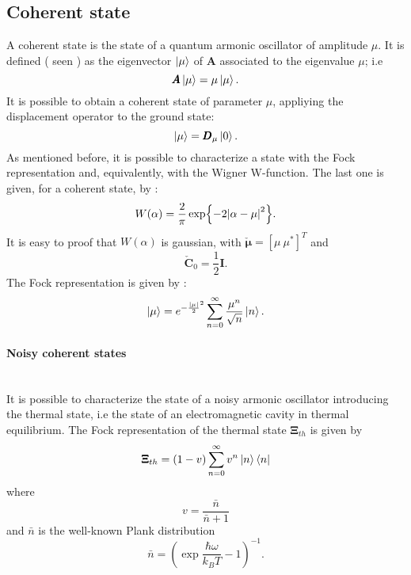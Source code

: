     \subsection{Coherent state}
        A coherent state is the state of a quantum armonic oscillator of amplitude $\mu$.
        It is defined (\cite{tesiGuerrini} seen \cite{CohSt_Glauber,CohSt_Glauber2}) as the eigenvector $\ket{\mu}$ of $\pmb{A}$ 
        associated to the eigenvalue $\mu$; i.e
        \begin{equation}
            \pmb{A}\ket{\mu}=\mu\ket{\mu}.
        \end{equation}
        It is possible to obtain a coherent state of parameter $\mu$, appliying the displacement
        operator to the ground state:
        \begin{equation}
            \ket{\mu}=\pmb{D}_\mu\ket{0}.
        \end{equation}
        As mentioned before, it is possible to characterize a state with the Fock representation
        and, equivalently, with the Wigner W-function. The last one is given, for a coherent state,
        by \cite{QuantumNoise}:
        \begin{equation}
            W(\alpha)=\frac{2}{\pi}\exp{-2\absolutevalue{\alpha-\mu}^2}.
            \label{eq:WignerCoh}
        \end{equation}
        It is easy to proof that $W(\alpha)$ is gaussian, with $\check{\pmb{\mu}}=[\mu\ \mu^*]^T$ and
        \begin{equation*}
            \check{\pmb{C}}_0=\frac{1}{2}\pmb{I}.
        \end{equation*} 
        The Fock representation is given by \cite{Dowling}:
        \begin{equation}
            \ket{\mu}=e^{-\frac{\absolutevalue{\mu}}{2}^2}\sum_{n=0}^{\infty}
            \frac{\mu^n}{\sqrt{n}}\ket{n}.
        \end{equation}

        \paragraph{Noisy coherent states}\mbox{} \\
        \label{par:NoisycohState}
        It is possible to characterize the state of a noisy armonic oscillator introducing
        the thermal state, i.e the state of an electromagnetic cavity in thermal equilibrium.
        The Fock representation of the thermal state $\pmb{\Xi}_{th}$ is given by \cite{tesiGuerrini}
        \begin{equation}
            \pmb{\Xi}_{th}=(1-v)\sum_{n=0}^{\infty}v^n\ket{n}\bra{n}
        \end{equation}
        where
        \begin{equation*}
            v=\frac{\bar{n}}{\bar{n}+1}
        \end{equation*}
        and $\bar{n}$ is the well-known Plank distribution
        \begin{equation*}
            \bar{n}=\left(\exp{\frac{\hbar\omega}{k_B T}}-1\right)^{-1}.
            \label{eq:nbar}
        \end{equation*}

